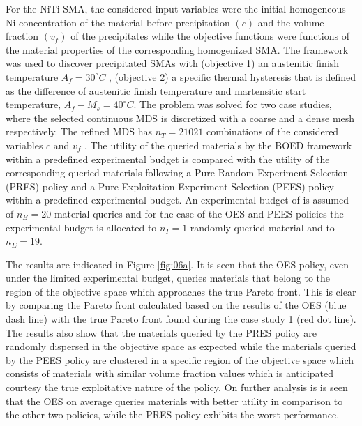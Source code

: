 \documentclass[utf8]{frontiersSCNS} %
\begin{document}
For the NiTi SMA, the considered input variables were the  initial homogeneous Ni concentration of the material before precipitation $(c)$ and the volume fraction $(v_f)$ of the precipitates while the objective functions were functions of the material properties of the corresponding homogenized SMA. The framework was used to  discover precipitated SMAs with (objective 1) an austenitic finish temperature $A_f = 30^\circ C$ , (objective 2) a specific thermal hysteresis that is defined as the difference of austenitic finish temperature and martensitic start temperature, $A_f - M_s = 40^\circ C$. The problem was solved for two case studies, where the selected continuous MDS is discretized with a coarse and a dense mesh respectively. The refined MDS has $n_T = 21021$ combinations of the considered variables $c$ and $v_f$ . The utility of the queried materials by the BOED framework within a predefined experimental budget is compared with the utility of the corresponding queried materials following a Pure Random Experiment Selection (PRES) policy and a Pure Exploitation Experiment Selection (PEES) policy within a predefined experimental budget. An experimental budget of is assumed of $n_B = 20$ material queries and for the case of the OES and PEES policies the experimental budget is allocated to $n_I =1$ randomly queried material and to $n_E = 19$. 

The results are indicated in Figure \ref{fig:06a}. It is seen that the OES policy, even under the limited experimental budget, queries materials that belong to the region of the objective space which approaches the true Pareto front. This is clear by comparing the Pareto front calculated based on the results of the OES (blue dash line) with the true Pareto front found during the case study 1 (red dot line). The results also show that the materials queried by the PRES policy are randomly dispersed in the objective space as  expected while the materials queried by the PEES policy are clustered in a specific region of the objective space which consists of materials with similar volume fraction values which is anticipated courtesy the true exploitative nature of the policy. On further analysis is is seen that the OES on average queries materials with better utility in comparison to the other two policies, while the PRES policy exhibits the worst performance. 
\end{document}
